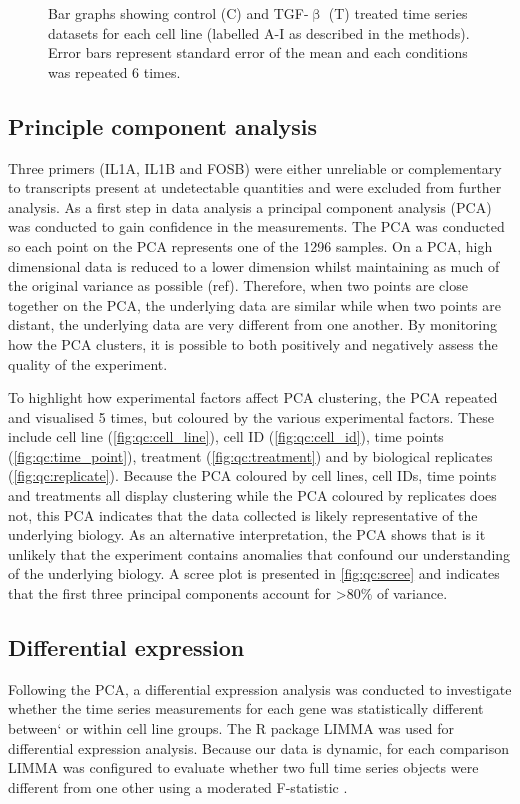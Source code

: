 \documentclass[alpha-refs]{wiley-article}
\newcommand{\tgf}{TGF-$\upbeta$}
\begin{document}
\begin{figure}[p]
\begin{minipage}{0.1\textwidth}
	\end{minipage}
	\caption{Bar graphs showing control (C) and \tgf{} (T) treated time series datasets for each cell line (labelled A-I as described in the methods). Error bars represent standard error of the mean and each conditions was repeated 6 times.}
	\label{fig:bar_graphs}
\end{figure}
%
\subsection{Principle component analysis}
Three primers (IL1A, IL1B and FOSB) were either unreliable or complementary to transcripts present at undetectable quantities and were excluded from further analysis. As a first step in data analysis a principal component analysis (PCA) was conducted to gain confidence in the measurements. The PCA was conducted so each point on the PCA represents one of the 1296 samples. On a PCA, high dimensional data is reduced to a lower dimension whilst maintaining as much of the original variance as possible (ref). Therefore, when two points are close together on the PCA, the underlying data are similar while when two points are distant, the underlying data are very different from one another. By monitoring how the PCA clusters, it is possible to both positively and negatively assess the quality of the experiment. 

To highlight how experimental factors affect PCA clustering, the PCA repeated and visualised 5 times, but coloured by the various experimental factors. These include cell line (\cref{fig:qc:cell_line}), cell ID (\cref{fig:qc:cell_id}), time points (\cref{fig:qc:time_point}), treatment (\cref{fig:qc:treatment}) and by biological replicates (\cref{fig:qc:replicate}). Because the PCA coloured by cell lines, cell IDs, time points and treatments all display clustering while the PCA coloured by replicates does not, this PCA indicates that the data collected is likely representative of the underlying biology. As an alternative interpretation, the PCA shows that is it unlikely that the experiment contains anomalies that confound our understanding of the underlying biology. A scree plot is presented in \cref{fig:qc:scree} and indicates that the first three principal components account for >80\% of variance.

\subsection{Differential expression}
Following the PCA, a differential expression analysis was conducted to investigate whether the time series measurements for each gene was statistically different between` or within cell line groups. The R package LIMMA was used for differential expression analysis. Because our data is dynamic, for each comparison LIMMA was configured to evaluate whether two full time series objects were different from one other using a moderated F-statistic \citep{Ritchie2015, Smyth2004, Smyth2005}. 
\end{document}
